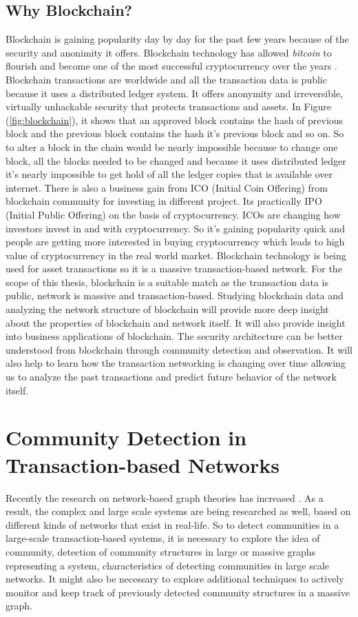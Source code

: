 \subsection{Why Blockchain?}
Blockchain is gaining popularity day by day for the past few years because of the security and anonimity it offers. Blockchain technology has allowed \textit{bitcoin} to flourish and become one of the most successful cryptocurrency over the years \cite{ref-41}. Blockchain transactions are worldwide and all the transaction data is public because it uses a distributed ledger system. It offers anonymity and irreversible, virtually unhackable security that protects transactions and assets. In Figure (\ref{fig:blockchain}), it shows that an approved block contains the hash of previous block and the previous block contains the hash it's previous block and so on. So to alter a block in the chain would be nearly impossible because to change one block, all the blocks needed to be changed and because it uses distributed ledger it's nearly impossible to get hold of all the ledger copies that is available over internet. There is also a business gain from ICO (Initial Coin Offering) from blockchain community for investing in different project. Its practically IPO (Initial Public Offering) on the basis of cryptocurrency. ICOs are changing how investors invest in and with cryptocurrency. So it's gaining popularity quick and people are getting more interested in buying cryptocurrency which leads to high value of cryptocurrency in the real world market. Blockchain technology is being used for asset transactions so it is a massive transaction-based network. For the scope of this thesis, blockchain is a suitable match as the transaction data is public, network is massive and transaction-based. Studying blockchain data and analyzing the network structure of blockchain will provide more deep insight about the properties of blockchain and network itself. It will also provide insight into business applications of blockchain. The security architecture can be better understood from blockchain through community detection and observation. It will also help to learn how the transaction networking is changing over time allowing us to analyze the past transactions and predict future behavior of the network itself.

\section{Community Detection in Transaction-based Networks}
Recently the research on network-based graph theories has increased \cite{ref-1}. As a result, the complex and large scale systems are being researched as well, based on different kinds of networks that exist in real-life. So to detect communities in a large-scale transaction-based systems, it is necessary to explore the idea of community, detection of community structures in large or massive graphs representing a system, characteristics of detecting communities in large scale networks. It might also be necessary to explore additional techniques to actively monitor and keep track of previously detected community structures in a massive graph.

